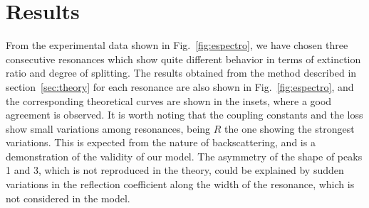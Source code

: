 \documentclass[10pt,letterpaper]{article}
\begin{document}

\section{Results}

From the experimental data shown in Fig.~\ref{fig:espectro}, we have chosen three consecutive resonances which show quite different behavior in terms of extinction ratio and degree of splitting. The results obtained from the method described in section~\ref{sec:theory} for each resonance are also shown in Fig.~\ref{fig:espectro}, and the corresponding theoretical curves are shown in the insets, where a good agreement is observed. It is worth noting that the coupling constants and the loss show small variations among resonances, being $R$ the one showing the strongest variations. This is expected from the nature of backscattering, and is a demonstration of the validity of our model. The asymmetry of the shape of peaks 1 and 3, which is not reproduced in the theory, could be explained by sudden variations in the reflection coefficient along the width of the resonance, which is not considered in the model.



\end{document}
